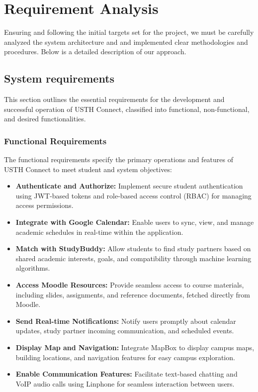 \documentclass[12pt]{article}
\begin{document}
\pagebreak


\section{Requirement Analysis}
Ensuring and following the initial targets set for the project, we must be carefully analyzed the system
architecture and and implemented clear methodologies and procedures. Below is a detailed description of our approach.

\subsection{System requirements}
This section outlines the essential requirements for the development and successful operation of USTH Connect, classified into functional, non-functional, and desired functionalities.

\subsubsection{Functional Requirements}
The functional requirements specify the primary operations and features of USTH Connect to meet student and system objectives:  
\begin{itemize}  
    \item \textbf{Authenticate and Authorize:} Implement secure student authentication using JWT-based tokens and role-based access control (RBAC) for managing access permissions.  
    \item \textbf{Integrate with Google Calendar:} Enable users to sync, view, and manage academic schedules in real-time within the application.  
    \item \textbf{Match with StudyBuddy:} Allow students to find study partners based on shared academic interests, goals, and compatibility through machine learning algorithms.  
    \item \textbf{Access Moodle Resources:} Provide seamless access to course materials, including slides, assignments, and reference documents, fetched directly from Moodle.  
    \item \textbf{Send Real-time Notifications:} Notify users promptly about calendar updates, study partner incoming communication, and scheduled events.  
    \item \textbf{Display Map and Navigation:} Integrate MapBox to display campus maps, building locations, and navigation features for easy campus exploration.  
    \item \textbf{Enable Communication Features:} Facilitate text-based chatting and VoIP audio calls using Linphone for seamless interaction between users.  
\end{itemize} 
\end{document}
